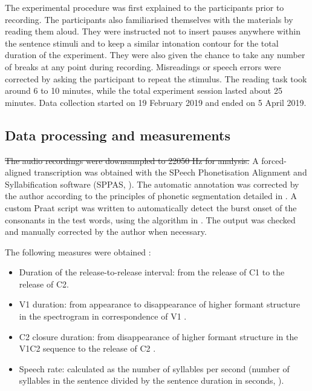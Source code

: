 \documentclass[12pt,a4paper,]{article}
\providecommand{\tightlist}{%
  \setlength{\itemsep}{0pt}\setlength{\parskip}{0pt}}
\providecommand{\DIFaddtex}[1]{{\protect\color{blue}\uwave{#1}}} %
\providecommand{\DIFdeltex}[1]{{\protect\color{red}\sout{#1}}}                      %
\providecommand{\DIFaddbegin}{} %
\providecommand{\DIFaddend}{} %
\providecommand{\DIFdelbegin}{} %
\providecommand{\DIFdelend}{} %
\providecommand{\DIFadd}[1]{\texorpdfstring{\DIFaddtex{#1}}{#1}} %
\providecommand{\DIFdel}[1]{\texorpdfstring{\DIFdeltex{#1}}{}} %
\newcommand{\DIFscaledelfig}{0.5}
\newlength{\DIFdelgraphicswidth} %
\newlength{\DIFdelgraphicsheight} %
\newcommand{\DIFaddincludegraphics}[2][]{{\color{blue}\fbox{\DIFOincludegraphics[#1]{#2}}}} %
\newcommand{\DIFdelincludegraphics}[2][]{%
\sbox{\DIFdelgraphicsbox}{\DIFOincludegraphics[#1]{#2}}%
\settoboxwidth{\DIFdelgraphicswidth}{\DIFdelgraphicsbox} %
\settoboxtotalheight{\DIFdelgraphicsheight}{\DIFdelgraphicsbox} %
\scalebox{\DIFscaledelfig}{%
\parbox[b]{\DIFdelgraphicswidth}{\usebox{\DIFdelgraphicsbox}\\[-\baselineskip] \rule{\DIFdelgraphicswidth}{0em}}\llap{\resizebox{\DIFdelgraphicswidth}{\DIFdelgraphicsheight}{%
\setlength{\unitlength}{\DIFdelgraphicswidth}%
\begin{picture}(1,1)%
\thicklines\linethickness{2pt} %
{\color[rgb]{1,0,0}\put(0,0){\framebox(1,1){}}}%
{\color[rgb]{1,0,0}\put(0,0){\line( 1,1){1}}}%
{\color[rgb]{1,0,0}\put(0,1){\line(1,-1){1}}}%
\end{picture}%
}\hspace*{3pt}}} %
} %
\DeclareRobustCommand{\DIFaddbegin}{\DIFOaddbegin \let\includegraphics\DIFaddincludegraphics} %
\DeclareRobustCommand{\DIFaddend}{\DIFOaddend \let\includegraphics\DIFOincludegraphics} %
\DeclareRobustCommand{\DIFdelbegin}{\DIFOdelbegin \let\includegraphics\DIFdelincludegraphics} %
\DeclareRobustCommand{\DIFdelend}{\DIFOaddend \let\includegraphics\DIFOincludegraphics} %
\begin{document}
The experimental procedure was first explained to the participants prior
to recording. The participants also familiarised themselves with the
materials by reading them aloud. They were instructed not to insert
pauses anywhere within the sentence stimuli and to keep a similar
intonation contour for the total duration of the experiment. They were
also given the chance to take any number of breaks at any point during
recording. Misreadings or speech errors were corrected by asking the
participant to repeat the stimulus. The reading task took around 6 to 10
minutes, while the total experiment session lasted about 25 minutes.
Data collection started on 19 February 2019 and ended on 5 April 2019.

\hypertarget{data-processing-and-measurements}{%
\subsection{Data processing and
measurements}\label{data-processing-and-measurements}}

\DIFdelbegin \DIFdel{The audio recordings were downsampled to 22050 Hz for analysis. }\DIFdelend A forced-aligned transcription was obtained with the SPeech
Phonetisation Alignment and Syllabification software (SPPAS,
\citealt{bigi2015}). The automatic annotation was corrected by the
author according to the principles of phonetic segmentation detailed in
\citet{machac2009}. A custom Praat script was written to automatically
detect the burst onset of the consonants in the test words, using the
algorithm in \citet{ananthapadmanabha2014}. The output was checked and
manually corrected by the author when necessary.

The following measures were obtained \DIFaddbegin \DIFadd{via a custom Praat script}\DIFaddend :

\begin{itemize}
\tightlist
\item
  Duration of the release-to-release interval: from the release of C1 to
  the release of C2.
\item
  V1 duration: from appearance to disappearance of higher formant
  structure in the spectrogram in correspondence of V1
  \citep{machac2009}.
\item
  C2 closure duration: from disappearance of higher formant structure in
  the V1C2 sequence to the release of C2 \citep{machac2009}.
\item
  Speech rate: calculated as the number of syllables per second (number
  of syllables in the sentence divided by the sentence duration in
  seconds, \citealt{plug2018a}).
\end{itemize}
\end{document}
